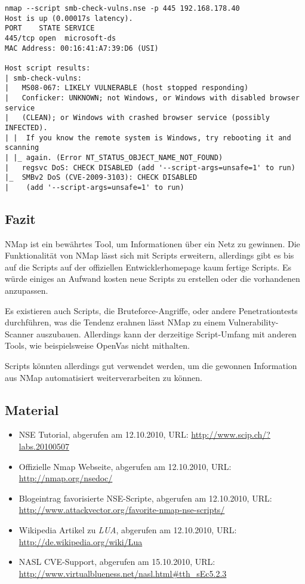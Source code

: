 \begin{lstlisting}[language={}]
nmap --script smb-check-vulns.nse -p 445 192.168.178.40
Host is up (0.00017s latency).
PORT    STATE SERVICE
445/tcp open  microsoft-ds
MAC Address: 00:16:41:A7:39:D6 (USI)

Host script results:
| smb-check-vulns:  
|   MS08-067: LIKELY VULNERABLE (host stopped responding)
|   Conficker: UNKNOWN; not Windows, or Windows with disabled browser service 
|   (CLEAN); or Windows with crashed browser service (possibly INFECTED).
| |  If you know the remote system is Windows, try rebooting it and scanning
| |_ again. (Error NT_STATUS_OBJECT_NAME_NOT_FOUND)
|   regsvc DoS: CHECK DISABLED (add '--script-args=unsafe=1' to run)
|_  SMBv2 DoS (CVE-2009-3103): CHECK DISABLED 
|    (add '--script-args=unsafe=1' to run)
\end{lstlisting}

\subsection{Fazit}

NMap ist ein bewährtes Tool, um Informationen über ein Netz zu
gewinnen. Die Funktionalität von NMap lässt sich mit Scripts
erweitern, allerdings gibt es bis auf die Scripts auf der offiziellen
Entwicklerhomepage kaum fertige Scripts. Es würde einiges an Aufwand
kosten neue Scripts zu erstellen oder die vorhandenen anzupassen.

Es existieren auch Scripts, die Bruteforce-Angriffe, oder andere
Penetrationtests durchführen, was die Tendenz erahnen lässt NMap zu
einem Vulnerability-Scanner auszubauen. Allerdings kann der derzeitige
Script-Umfang mit anderen Tools, wie beispielsweise OpenVas nicht
mithalten.

Scripts könnten allerdings gut verwendet werden, um die gewonnen
Information aus NMap automatisiert weiterverarbeiten zu können.

\subsection{Material}

\begin{itemize}
  \item NSE Tutorial, abgerufen am 12.10.2010,
      URL: \url{http://www.scip.ch/?labs.20100507}
  \item Offizielle Nmap Webseite, abgerufen am 12.10.2010,
      URL: \url{http://nmap.org/nsedoc/}
  \item Blogeintrag favorisierte NSE-Scripte, abgerufen am 12.10.2010,
      URL: \url{http://www.attackvector.org/favorite-nmap-nse-scripts/}
	\item Wikipedia Artikel zu \textit{LUA}, abgerufen am 12.10.2010,
	    URL: \url{http://de.wikipedia.org/wiki/Lua}
  \item NASL CVE-Support, abgerufen am 15.10.2010,
      URL: \url{http://www.virtualblueness.net/nasl.html\#tth_sEc5.2.3}
\end{itemize}
